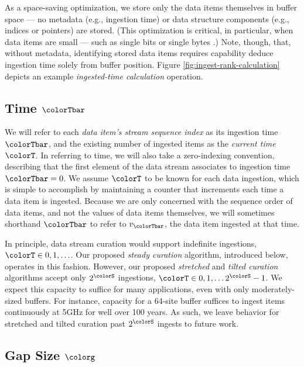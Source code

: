 As a space-saving optimization, we store only the data items themselves in buffer space --- no metadata (e.g., ingestion time) or data structure components (e.g., indices or pointers) are stored.
(This optimization is critical, in particular, when data items are small --- such as single bits or single bytes \citep{moreno2022hereditary}.)
Note, though, that, without metadata, identifying stored data items requires capability deduce ingestion time solely from buffer position.
Figure \ref{fig:ingest-rank-calculation} depicts an example \textit{ingested-time calculation} operation.

\subsection{Time $\colorTbar$}
\label{sec:notation-time}

We will refer to each \textit{data item's stream sequence index} as its ingestion time $\colorTbar$, and the existing number of ingested items as the \textit{current time} $\colorT$.
In referring to time, we will also take a zero-indexing convention, describing that the first element of the data stream associates to ingestion time $\colorTbar=0$.
We assume $\colorT$ to be known for each data ingestion, which is simple to accomplish by maintaining a counter that increments each time a data item is ingested.
Because we are only concerned with the sequence order of data items, and not the values of data items themselves, we will sometimes shorthand $\colorTbar$ to refer to $v_{\colorTbar}$, the data item ingested at that time.

In principle, data stream curation would support indefinite ingestions, $\colorT \in 0, 1, \ldots$.
Our proposed \textit{steady curation} algorithm, introduced below, operates in this fashion.
However, our proposed \textit{stretched} and \textit{tilted curation} algorithms accept only $2^{\colorS}$ ingestions, $\colorT \in 0, 1, \ldots 2^{\colorS} - 1$.
We expect this capacity to suffice for many applications, even with only moderately-sized buffers.
For instance, capacity for a 64-site buffer suffices to ingest items continuously at 5GHz for well over 100 years.
As such, we leave behavior for stretched and tilted curation past $2^{\colorS}$ ingests to future work.

\subsection{Gap Size $\colorg$}
\label{sec:notation-gapsize}

